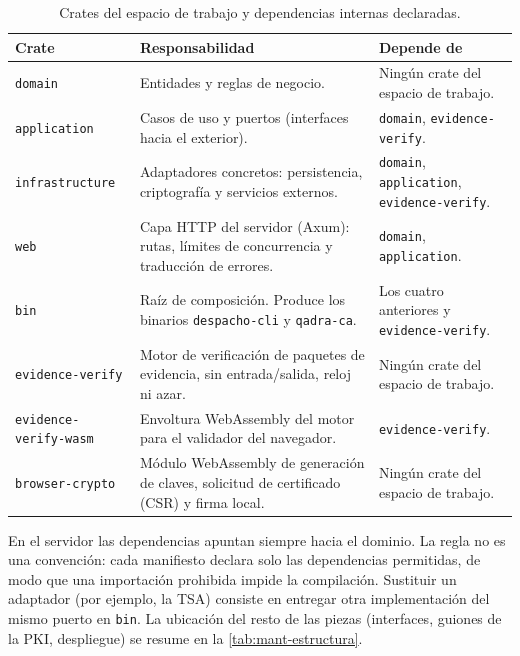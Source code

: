\begin{table}[H]
  \centering
  \caption{Crates del espacio de trabajo y dependencias internas
    declaradas.}\label{tab:arq-crates}
  \small
  \begin{tabularx}{\textwidth}{L{3.6cm} Y L{4.1cm}}
    \toprule
    \textbf{Crate} & \textbf{Responsabilidad} & \textbf{Depende de} \\
    \midrule
    \texttt{domain}
      & Entidades y reglas de negocio.
      & Ningún crate del espacio de trabajo. \\
    \texttt{application}
      & Casos de uso y puertos (interfaces hacia el exterior).
      & \texttt{domain}, \texttt{evidence-verify}. \\
    \texttt{infrastructure}
      & Adaptadores concretos: persistencia, criptografía y servicios
        externos.
      & \texttt{domain}, \texttt{application}, \texttt{evidence-verify}. \\
    \texttt{web}
      & Capa HTTP del servidor (Axum): rutas, límites de concurrencia y
        traducción de errores.
      & \texttt{domain}, \texttt{application}. \\
    \texttt{bin}
      & Raíz de composición. Produce los binarios \texttt{despacho-cli} y
        \texttt{qadra-ca}.
      & Los cuatro anteriores y \texttt{evidence-verify}. \\
    \texttt{evidence-verify}
      & Motor de verificación de paquetes de evidencia, sin entrada/salida,
        reloj ni azar.
      & Ningún crate del espacio de trabajo. \\
    \texttt{evidence-verify-wasm}
      & Envoltura WebAssembly del motor para el validador del navegador.
      & \texttt{evidence-verify}. \\
    \texttt{browser-crypto}
      & Módulo WebAssembly de generación de claves, solicitud de certificado
        (CSR) y firma local.
      & Ningún crate del espacio de trabajo. \\
    \bottomrule
  \end{tabularx}
\end{table}

En el servidor las dependencias apuntan siempre hacia el dominio. La regla no
es una convención: cada manifiesto  declara solo
las dependencias permitidas, de modo que una importación prohibida impide la
compilación. Sustituir un adaptador (por ejemplo, la TSA) consiste en entregar
otra implementación del mismo puerto en \texttt{bin}. La ubicación del
resto de las piezas (interfaces, guiones de la PKI, despliegue) se resume en
la \cref{tab:mant-estructura}.

